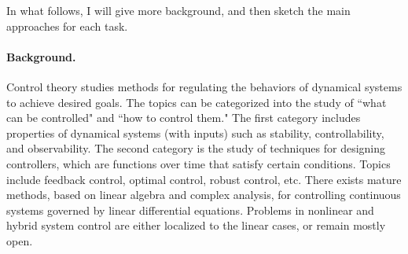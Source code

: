 \documentclass[10pt]{article}
\theoremstyle{definition}
\begin{document}
In what follows, I will give more background, and then sketch the main approaches for each task. 

\paragraph{Background.}

Control theory studies methods for regulating the behaviors of dynamical systems to achieve desired goals. The topics can be categorized into the study of ``what can be controlled" and ``how to control them." The first category includes properties of dynamical systems (with inputs) such as stability, controllability, and observability. The second category is the study of techniques for designing controllers, which are functions over time that satisfy certain conditions. Topics include feedback control, optimal control, robust control, etc. There exists mature methods, based on linear algebra and complex analysis, for controlling continuous systems governed by linear differential equations. Problems in nonlinear and hybrid system control are either localized to the linear cases, or remain mostly open. 
\end{document}
